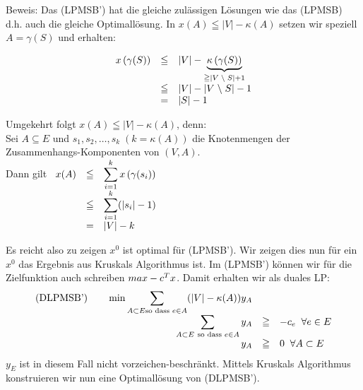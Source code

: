 Beweis: Das (LPMSB') hat die gleiche zulässigen Lösungen wie das (LPMSB)
d.h. auch die gleiche Optimallösung. In $x(A) \leqq |V| - \kappa (A)$
setzen wir speziell $A = \gamma(S)$ und erhalten:

\[\begin{array}{rcl}
x\left(\gamma(S)\right) &\leqq & |V| - \underbrace{\kappa\left(\gamma(S)
\right)}_{\geqq | V \;\backslash\; S| + 1}\\
&\leqq& |V|-| V \;\backslash\; S | -1\\
&=& | S | -1
\end{array}\]

Umgekehrt folgt $x(A) \leqq |V| - \kappa(A)$, denn:\\
Sei $A \subseteq E $ und $s_{1}, s_{2}, \ldots, s_{k} \; \left(k = \kappa(A)
\right)$ die Knotenmengen der Zusammenhangs-Komponenten von $(V,A)$.\\
Dann gilt $\begin{array}[t]{rcl} 
x(A) &\leqq & \displaystyle \sum_{i=1}^{k} x\left(\gamma (s_{i})\right)\\
&\leqq & \displaystyle \sum_{i=1}^{k} (|s_{i}| -1)\\
&=& |V|-k
\end{array}$

Es reicht also zu zeigen $x^{0}$ ist optimal für (LPMSB'). Wir zeigen dies
nun für ein $x^{0}$ das Ergebnis aus Kruskals Algorithmus ist. Im (LPMSB')
können wir für die Zielfunktion auch schreiben $\-max -c^{T}x$. Damit
erhalten wir als duales LP:
\[
\begin{array}{rcl}
\mbox{(DLPMSB')} \hspace{7mm} \min \displaystyle \sum_{A \subset E \mbox{\scriptsize so 
dass } e \in A} (|V| - \kappa(A)) y_{A}\\
 \displaystyle \sum_{A \subset E \mbox{ \scriptsize so dass }
e \in A} y_{A} &\geqq& -c_{e} \; \; \forall e \in E\\
y_{A} &\geqq& 0 \; \; \forall A \subset E
\end{array}
\]
$y_{E}$ ist in diesem Fall nicht vorzeichen-beschränkt. Mittels Kruskals
Algorithmus konstruieren wir nun eine Optimallösung von (DLPMSB').

